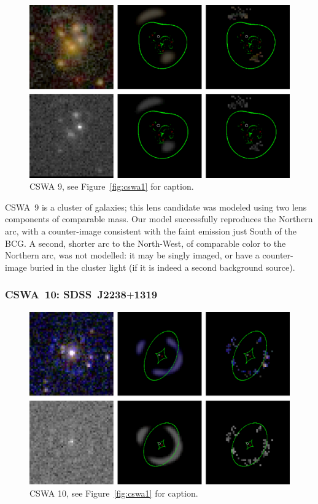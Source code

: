 \documentclass[iop]{emulateapj}
\begin{document}
\begin{figure}[!ht]
	\centering\includegraphics[width=\linewidth]{figs/9.eps}
	\caption{CSWA 9, see Figure~\ref{fig:cswa1} for caption.}
	\label{fig:cswa9}
\end{figure}

CSWA~9 is a cluster of galaxies; this lens candidate was modeled using two lens
components of comparable mass.  Our model successfully reproduces the Northern
arc, with a counter-image consistent with the faint emission just South of the
BCG. A second, shorter arc to the North-West, of comparable color to the
Northern arc, was not modelled: it may be singly imaged, or have a counter-image
buried in the cluster light (if it is indeed a second background source).


\subsubsection*{CSWA~10: SDSS\ J2238$+$1319}
\label{sec:results:indinotes:cswa10}


\begin{figure}[!ht]
	\centering\includegraphics[width=\linewidth]{figs/10.eps}
	\caption{CSWA 10, see Figure~\ref{fig:cswa1} for caption.}
	\label{fig:cswa10}
\end{figure}
\end{document}
